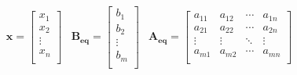 \begin{frame}
{\begin{equation*}
\begin{matrix}
			\mathbf{x} = 	\begin{bmatrix}
									x_1 \\ x_2 \\ \vdots \\ x_n \\
							\end{bmatrix} &

			\mathbf{B_{eq}} = 	\begin{bmatrix}
									b_1 \\ b_2 \\ \vdots \\ b_m \\
							\end{bmatrix} &

			\mathbf{A_{eq}} = 	\begin{bmatrix}
									a_{11} & a_{12} & \cdots & a_{1n} \\
									a_{21} & a_{22} & \cdots & a_{2n} \\
									\vdots & \vdots & \ddots & \vdots \\
									a_{m1} & a_{m2} & \cdots & a_{mn} \\
								\end{bmatrix} \\

		\end{matrix}
	\end{equation*}
	}
\end{frame}

